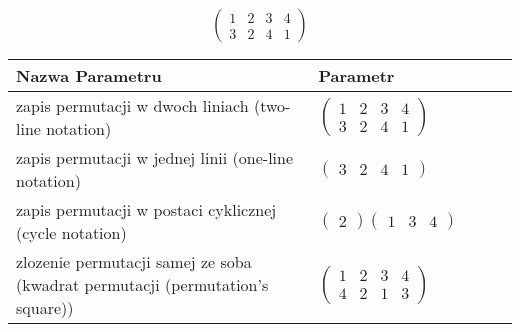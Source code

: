 \documentclass[12pt]{article}
\begin{document}
\subsection{}
\begin{center}
\[
\begin{pmatrix}
	1 & 2 & 3 & 4 \\ 
	3 & 2 & 4 & 1 
\end{pmatrix}
\]

\begin{tabular}{|m{0.6\linewidth}|m{0.4\linewidth}|}
	\hline
	Nazwa Parametru & Parametr \\
	\hline
	zapis permutacji w dwoch liniach (two-line notation) & $\begin{pmatrix} 1 & 2 & 3 & 4 \\ 
3 & 2 & 4 & 1 \end{pmatrix}$ \\ 
	\hline
	zapis permutacji w jednej linii (one-line notation) & $\begin{pmatrix} 3 & 2 & 4 & 1 \end{pmatrix}$ \\ 
	\hline
	zapis permutacji w postaci cyklicznej (cycle notation) & $\begin{pmatrix} 2 \end{pmatrix} \begin{pmatrix} 1 & 3 & 4 \end{pmatrix} $ \\ 
	\hline
	zlozenie permutacji samej ze soba (kwadrat permutacji (permutation's square)) & $\begin{pmatrix} 1 & 2 & 3 & 4 \\ 
4 & 2 & 1 & 3 \end{pmatrix}$ \\ 
	\hline
\end{tabular}
\end{center}
\end{document}
